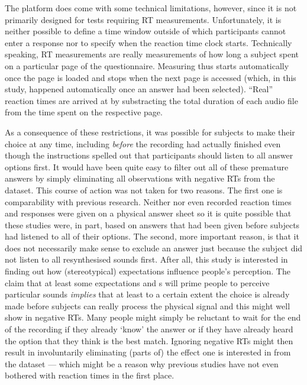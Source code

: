 The platform  does come with some technical limitations, however, since it is not primarily designed for tests requiring RT measurements.
Unfortunately, it is neither possible to define a time window outside of which participants cannot enter a response nor to specify when the reaction time clock starts.
Technically speaking, RT measurements are really measurements of how long a subject spent on a particular page of the questionnaire.
Measuring thus starts automatically once the page is loaded and stops when the next page is accessed (which, in this study, happened automatically once an answer had been selected).
``Real'' reaction times are arrived at by substracting the total duration of each audio file from the time spent on the respective page.

As a consequence of these restrictions, it was possible for subjects to make their choice at any time, including \emph{before} the recording had actually finished even though the instructions spelled out that participants should listen to all answer options first.
It would have been quite easy to filter out all of these premature answers by simply eliminating all observations with negative RTs from the dataset.
This course of action was not taken for two reasons.
The first one is comparability with previous research.
Neither \citealt{niedzielski1999} nor \citealt{hayetal2006b,haydrager2010} even recorded reaction times and responses were given on a physical answer sheet so it is quite possible that these studies were, in part, based on answers that had been given before subjects had listened to all of their options.
The second, more important reason, is that it does not necessarily make sense to exclude an answer just because the subject did not listen to all resynthesised sounds first.
After all, this study is interested in finding out how (stereotypical) expectations influence people's perception.
The claim that at least some expectations and s will prime people to perceive particular sounds \emph{implies} that at least to a certain extent the choice is already made before subjects can really process the physical signal and this might well show in negative RTs.
Many people might simply be reluctant to wait for the end of the recording if they already `know' the answer or if they have already heard the option that they think is the best match.
Ignoring negative RTs might then result in involuntarily eliminating (parts of) the  effect one is interested in from the dataset --- which might be a reason why previous studies have not even bothered with reaction times in the first place.

